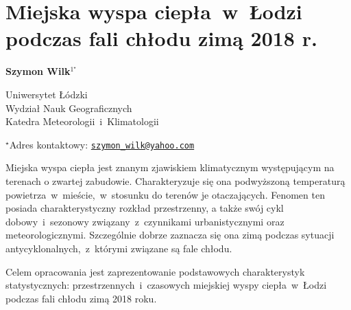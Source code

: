 \documentclass[\main/boa.tex]{subfiles}
\begin{document}
\sloppy


\section{Miejska wyspa ciepła~w~Łodzi podczas fali chłodu zimą 2018 r.}

\begin{center}
  {\bf {} Szymon Wilk$^{1^\star}$}
\end{center}

\vskip 0.3cm

\begin{affiliations}
\begin{enumerate}
\begin{minipage}{0.915\textwidth}
\centering
\item Uniwersytet Łódzki \\ Wydział Nauk Geograficznych \\ Katedra Meteorologii~i~Klimatologii\\[-2pt]
\end{minipage}
\end{enumerate}
$^\star$Adres kontaktowy: \href{mailto:szymon_wilk@yahoo.com}{\nolinkurl{szymon_wilk@yahoo.com}}\\
\end{affiliations}

\vskip 0.5cm


\vskip 0.5cm

Miejska wyspa ciepła jest znanym zjawiskiem klimatycznym występującym na terenach o zwartej zabudowie. Charakteryzuje się ona podwyższoną temperaturą powietrza~w~mieście,~w~stosunku do terenów je otaczających. Fenomen ten posiada charakterystyczny rozkład przestrzenny, a także swój cykl dobowy~i~sezonowy związany~z~czynnikami urbanistycznymi oraz meteorologicznymi. Szczególnie dobrze zaznacza się ona zimą podczas sytuacji antycyklonalnych,~z~którymi związane są fale chłodu.

	Celem opracowania jest zaprezentowanie podstawowych charakterystyk statystycznych: przestrzennych~i~czasowych miejskiej wyspy ciepła~w~Łodzi podczas fali chłodu zimą 2018 roku.
\end{document}
